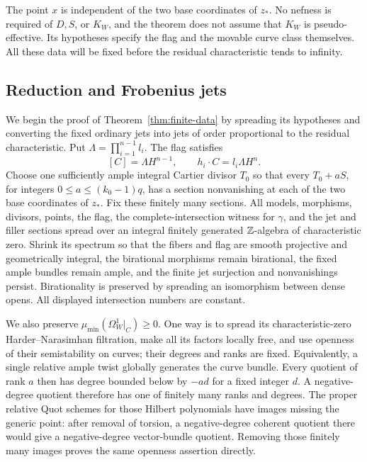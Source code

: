 The point $x$ is independent of the two base coordinates of $z_*$.
No nefness is required of $D,S$, or $K_W$, and the theorem does not
assume that $K_W$ is pseudo-effective. Its hypotheses specify the
flag and the movable curve class themselves. All these data will
be fixed before the residual characteristic tends to infinity.

\subsection{Reduction and Frobenius jets}
\label{fr:reduction}

We begin the proof of Theorem~\ref{thm:finite-data} by spreading
its hypotheses and converting the fixed ordinary jets
into jets of order proportional to the residual characteristic.
Put
$\Lambda=\prod_{i=1}^{n-1}l_i$. The flag satisfies
\begin{equation}\label{fr:flag-degrees}
 [C]=\Lambda H^{n-1},\qquad h_i\cdot C=l_i\Lambda H^n.
\end{equation}
Choose one sufficiently ample integral Cartier divisor $T_0$ so
that every $T_0+aS$, for integers $0\le a\le(k_0-1)q$, has a section
nonvanishing at each of the two base coordinates of $z_*$.
Fix these finitely many sections. All models, morphisms, divisors,
points, the flag, the complete-intersection witness for $\gamma$,
and the jet and filler sections spread over an integral finitely
generated $\mathbb Z$-algebra of characteristic zero. Shrink its
spectrum so that the fibers and flag are smooth projective and
geometrically integral, the birational morphisms remain birational,
the fixed ample bundles remain ample, and the finite jet
surjection and nonvanishings persist. Birationality is preserved
by spreading an isomorphism between dense opens. All displayed
intersection numbers are constant.

We also preserve $\mu_{\min}(\Omega_W^1|_C)\ge0$.
One way is to spread its characteristic-zero Harder--Narasimhan
filtration, make all its factors locally free, and use openness
of their semistability on curves; their degrees and ranks are
fixed. Equivalently, a single relative ample twist globally
generates the curve bundle. Every quotient of rank $a$ then has
degree bounded below by $-ad$ for a fixed integer $d$.
A negative-degree quotient therefore has one of finitely many ranks
and degrees. The proper relative Quot schemes for those Hilbert
polynomials have images missing the generic point: after removal
of torsion, a negative-degree coherent quotient there would
give a negative-degree vector-bundle quotient. Removing those
finitely many images proves the same openness assertion directly.


